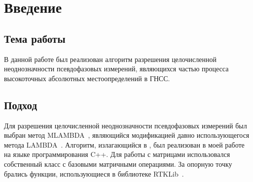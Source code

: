 \documentclass[12pt]{matmex-diploma}
\begin{document}
\section*{Введение}
\subsection*{Тема работы}
В данной работе был реализован алгоритм разрешения целочисленной неоднозначности
псевдофазовых измерений, являющихся частью процесса высокоточных абсолютных
местоопределений в ГНСС.
\subsection*{Подход}
Для разрешения целочисленной неоднозначности псевдофазовых измерений был выбран 
метод MLAMBDA~\cite{article:mlambda}, являющийся модификацией давно использующегося
метода LAMBDA~\cite{article:lambda}. Алгоритм, излагающийся в \cite{article:mlambda},
был реализован в моей работе на языке программирования C++. Для работы с матрицами
использовался собственный класс с базовыми матричными операциями.
За опорную точку брались функции, использующиеся в библиотеке RTKLib~\cite{page:rtk}.
\
\end{document}
